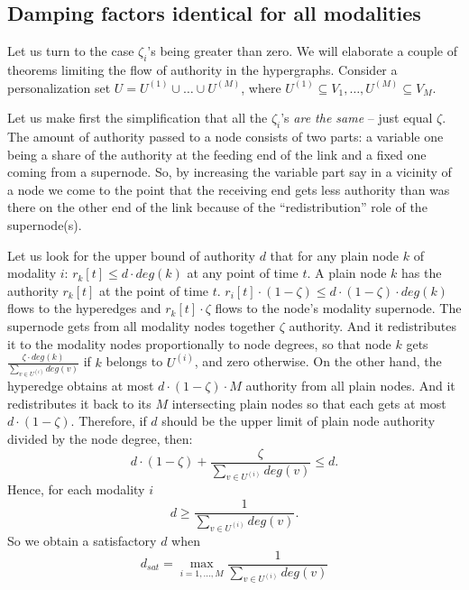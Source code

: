 \documentclass{fundam}
\newcommand{\N}{ V }
\begin{document}
\subsection{Damping factors identical for all modalities}

Let us turn to the case $\zeta_{i}$'s being greater than zero.   We will elaborate a couple of theorems limiting the flow of authority in the hypergraphs.
Consider a personalization set $U=U^{(1)}\cup \dots \cup U^{(M)}$, where
$U^{(1)}\subseteq \N_1,\dots, U^{(M)}\subseteq \N_M.$

Let us make first the simplification that all the $\zeta_{i}$'s \emph{are the same} -- just equal  $\zeta$.
The amount of authority passed to a node consists of two parts: a variable one being a share of the authority at the feeding end of the link and a fixed one coming from a supernode. So, by increasing the variable part say in a vicinity of  a node we come to the point that the receiving end gets less authority than was there on the other end of the link because of the ``redistribution'' role of the supernode(s).

\medskip
Let us  look for the upper bound of authority $d$
that for any plain node $k$ of modality $i$: $r_{k}[t]\le d\cdot deg(k)$ at any point of time $t$.
 A plain node $k$ has the authority $r_{k}[t]$ at the point of time $t$. $r_{i}[t]\cdot (1-\zeta)\le d\cdot (1-\zeta)\cdot deg(k)$ flows to the hyperedges     and $r_{k}[t]\cdot \zeta$ flows to the node's modality supernode.
The supernode gets from all modality nodes together $\zeta$ authority.
And it redistributes it to the modality nodes proportionally to node degrees, so that node $k$ gets $\frac{\zeta\cdot deg(k) }{\sum_{v \in U^{(i)}}deg(v)}$ if $k$ belongs to $U^{(i)}$, and zero otherwise.
On the other hand, the hyperedge obtains at most $d\cdot(1-\zeta)\cdot M$ authority from all plain nodes. And it redistributes it back to its $M$ intersecting plain nodes so that each gets at most $d\cdot(1-\zeta)$. Therefore, if $d$ should be the upper limit of plain node authority divided by the node degree, then:
$$ d{\cdot}(1-\zeta ) +
 \frac{\zeta }{\sum_{v \in U^{(i)}}deg(v)}  \le d.$$
Hence, for each modality $i$
$$d\ge \frac{1}{\sum_{v\in U^{(i)}} deg(v)} .$$
So we obtain a satisfactory $d$ when
$$d_{sat}=
\max_{i=1,\dots,M}\frac{1}{\sum_{v\in U^{(i)}} deg(v)}$$
\end{document}
